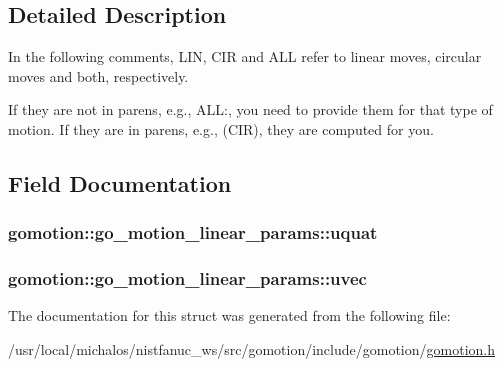 \subsection{Detailed Description}
In the following comments, L\-I\-N, C\-I\-R and A\-L\-L refer to linear moves, circular moves and both, respectively. 

If they are not in parens, e.\-g., A\-L\-L\-:, you need to provide them for that type of motion. If they are in parens, e.\-g., (C\-I\-R), they are computed for you. 

\subsection{Field Documentation}
\hypertarget{structgomotion_1_1go__motion__linear__params_af354e180468997cc31fca9f21a9bc325}{
\subsubsection[{uquat}]{ gomotion\-::go\-\_\-motion\-\_\-linear\-\_\-params\-::uquat}}\label{structgomotion_1_1go__motion__linear__params_af354e180468997cc31fca9f21a9bc325}
\hypertarget{structgomotion_1_1go__motion__linear__params_ab1865f783998b55efb3c97f62e6a4f7d}{
\subsubsection[{uvec}]{ gomotion\-::go\-\_\-motion\-\_\-linear\-\_\-params\-::uvec}}\label{structgomotion_1_1go__motion__linear__params_ab1865f783998b55efb3c97f62e6a4f7d}


The documentation for this struct was generated from the following file\-:\begin{DoxyCompactItemize}
\item 
/usr/local/michalos/nistfanuc\-\_\-ws/src/gomotion/include/gomotion/\hyperlink{gomotion_8h}{gomotion.\-h}\end{DoxyCompactItemize}

